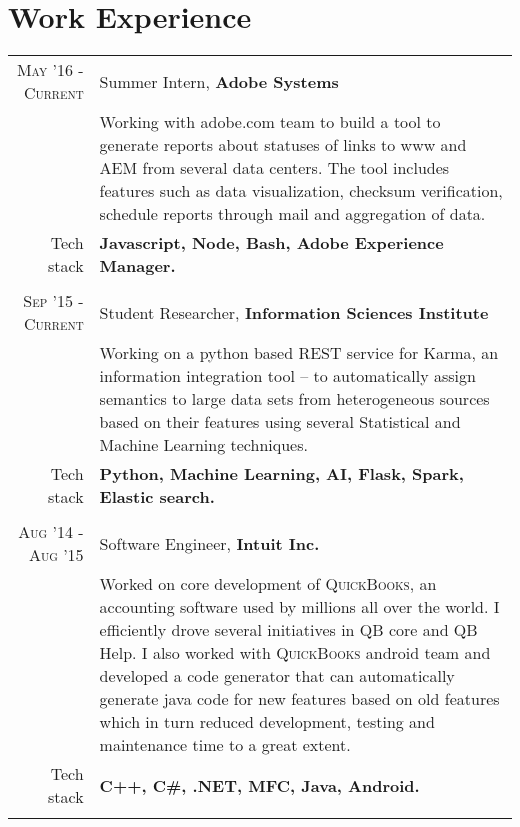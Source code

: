 \section{Work Experience}
\renewcommand{\arraystretch}{0.85}%
\begin{tabular}{r|p{13cm}}
\textsc{May '16 - Current} & Summer Intern, \textbf{Adobe Systems} \\
& \small{Working with adobe.com team to build a tool to generate reports about statuses of links to www and AEM from several data centers. The tool includes features such as data visualization, checksum verification, schedule reports through mail and aggregation of data.}\\
\small{Tech stack} &\footnotesize{\textbf{Javascript, Node, Bash, Adobe Experience Manager.}} \\
\multicolumn{2}{c}{} \\

\textsc{Sep '15 - Current} & Student Researcher, \textbf{Information Sciences Institute} \\
& \small{Working on a python based REST service for Karma, an information integration tool – to automatically assign semantics to large data sets from heterogeneous sources based on their features using several Statistical and Machine Learning techniques.}\\
\small{Tech stack} &\footnotesize{\textbf{Python, Machine Learning, AI, Flask, Spark, Elastic search.}} \\
\multicolumn{2}{c}{} \\

\textsc{Aug '14 - Aug '15 } & Software Engineer, \textbf{Intuit Inc.} \\
& \small{Worked on core development of \textsc{QuickBooks}, an accounting software used by millions all over the world. I efficiently drove several initiatives in QB core and QB Help. I also worked with \textsc{QuickBooks} android team and developed a code generator that can automatically generate java code for new features based on old features which in turn reduced development, testing and maintenance time to a great extent.}\\
\small{Tech stack} &\footnotesize{\textbf{C++, C\#, .NET, MFC, Java, Android.}} \\
\multicolumn{2}{c}{}



\end{tabular}
